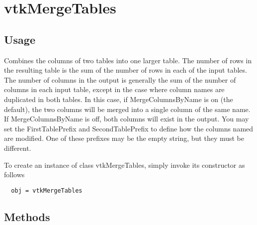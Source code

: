 \section{vtkMergeTables}

\subsection{Usage}

 Combines the columns of two tables into one larger table.
 The number of rows in the resulting table is the sum of the number of
 rows in each of the input tables.
 The number of columns in the output is generally the sum of the number
 of columns in each input table, except in the case where column names
 are duplicated in both tables.
 In this case, if MergeColumnsByName is on (the default), the two columns
 will be merged into a single column of the same name.
 If MergeColumnsByName is off, both columns will exist in the output.
 You may set the FirstTablePrefix and SecondTablePrefix to define how
 the columns named are modified.  One of these prefixes may be the empty
 string, but they must be different.

To create an instance of class vtkMergeTables, simply
invoke its constructor as follows
\begin{verbatim}
  obj = vtkMergeTables
\end{verbatim}
\subsection{Methods}

